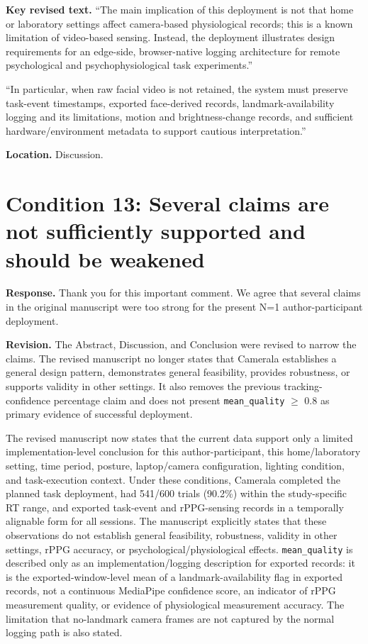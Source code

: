 \documentclass[11pt]{article}
\newcommand{\condition}[2]{\section*{Condition #1: #2}}
\begin{document}
\textbf{Key revised text.}
``The main implication of this deployment is not that home or laboratory settings affect camera-based physiological records; this is a known limitation of video-based sensing.
Instead, the deployment illustrates design requirements for an edge-side, browser-native logging architecture for remote psychological and psychophysiological task experiments.''

``In particular, when raw facial video is not retained, the system must preserve task-event timestamps, exported face-derived records, landmark-availability logging and its limitations, motion and brightness-change records, and sufficient hardware/environment metadata to support cautious interpretation.''

\textbf{Location.}
Discussion.

\condition{13}{Several claims are not sufficiently supported and should be weakened}
\textbf{Response.}
Thank you for this important comment.
We agree that several claims in the original manuscript were too strong for the present N=1 author-participant deployment.

\textbf{Revision.}
The Abstract, Discussion, and Conclusion were revised to narrow the claims.
The revised manuscript no longer states that Camerala establishes a general design pattern, demonstrates general feasibility, provides robustness, or supports validity in other settings.
It also removes the previous tracking-confidence percentage claim and does not present \texttt{mean\_quality} $\geq$ 0.8 as primary evidence of successful deployment.

The revised manuscript now states that the current data support only a limited implementation-level conclusion for this author-participant, this home/laboratory setting, time period, posture, laptop/camera configuration, lighting condition, and task-execution context.
Under these conditions, Camerala completed the planned task deployment, had 541/600 trials (90.2\%) within the study-specific RT range, and exported task-event and rPPG-sensing records in a temporally alignable form for all sessions.
The manuscript explicitly states that these observations do not establish general feasibility, robustness, validity in other settings, rPPG accuracy, or psychological/physiological effects.
\texttt{mean\_quality} is described only as an implementation/logging description for exported records: it is the exported-window-level mean of a landmark-availability flag in exported records, not a continuous MediaPipe confidence score, an indicator of rPPG measurement quality, or evidence of physiological measurement accuracy.
The limitation that no-landmark camera frames are not captured by the normal logging path is also stated.
\end{document}
